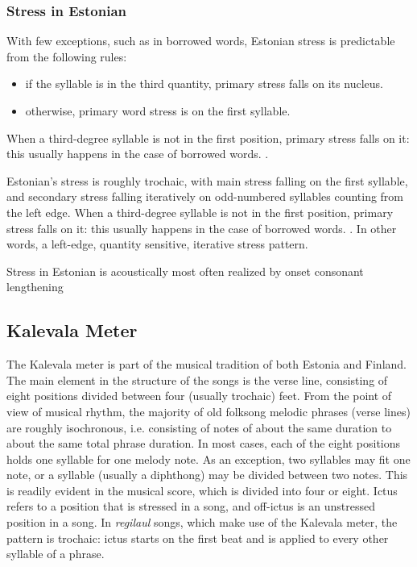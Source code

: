 \documentclass[12pt]{article}
\begin{document}

\subsubsection*{Stress in Estonian} 
 With few exceptions, such as in borrowed words, Estonian stress is predictable from the following rules:
 \begin{itemize}
 	\item if the syllable is in the third quantity, primary stress falls on its nucleus. 
	\item otherwise, primary word stress is on the first syllable. 
\end{itemize}
When a third-degree syllable is not in the first position, primary stress falls on it: this usually happens in the case of borrowed words. \cite{lehisteFunctionQuantityFinnish1965}. 


Estonian's stress is roughly trochaic, with main stress falling on the first syllable, and secondary stress falling iteratively on odd-numbered syllables counting from the left edge. When a third-degree syllable is not in the first position, primary stress falls on it: this usually happens in the case of borrowed words. \cite{lehisteFunctionQuantityFinnish1965}. 
In other words, a left-edge, quantity sensitive, iterative stress pattern.

 Stress in Estonian is acoustically most often realized by onset consonant lengthening \cite{gordonPHONETICCORRELATESSTRESS1997} 
\subsection*{Kalevala Meter}
  The Kalevala meter is part of the musical tradition of both Estonia and Finland. The main element in the structure of the songs is the verse line, consisting of eight positions divided between four (usually trochaic) feet. From the point of view of musical rhythm, the majority of old folksong melodic phrases  (verse lines) are roughly isochronous, i.e. consisting of notes of about the same
 duration to about the same total phrase duration. In most cases, each of the eight positions holds one syllable for one melody note. As an exception, two syllables may fit one note, or a syllable (usually a diphthong) may be divided between two notes. This is readily evident in the musical score, which is divided into four or eight. Ictus refers to a position that is stressed in a song, and off-ictus is an unstressed position in a song. In {\it regilaul} songs, which make use of the Kalevala meter, the pattern is trochaic: ictus starts on the first beat and is applied to every other syllable of a phrase. \\
 
\end{document}
